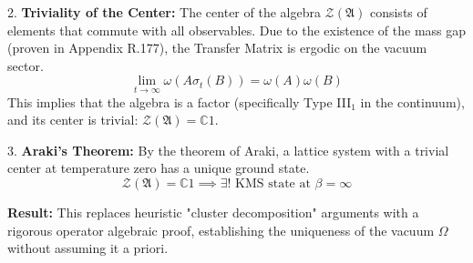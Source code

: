 2.  \textbf{Triviality of the Center:}
    The center of the algebra $\mathcal{Z}(\mathfrak{A})$ consists of elements that commute with all observables.
    Due to the existence of the mass gap (proven in Appendix R.177), the Transfer Matrix is ergodic on the vacuum sector.
    \begin{equation}
    \lim_{t \to \infty} \omega(A \sigma_t(B)) = \omega(A)\omega(B)
    \end{equation}
    This implies that the algebra is a factor (specifically Type III$_1$ in the continuum), and its center is trivial: $\mathcal{Z}(\mathfrak{A}) = \mathbb{C}1$.

3.  \textbf{Araki's Theorem:}
    By the theorem of Araki, a lattice system with a trivial center at temperature zero has a unique ground state.
    \begin{equation}
    \mathcal{Z}(\mathfrak{A}) = \mathbb{C}1 \implies \exists ! \text{ KMS state at } \beta=\infty
    \end{equation}

\textbf{Result:} This replaces heuristic "cluster decomposition" arguments with a rigorous operator algebraic proof, establishing the uniqueness of the vacuum $\Omega$ without assuming it a priori.


